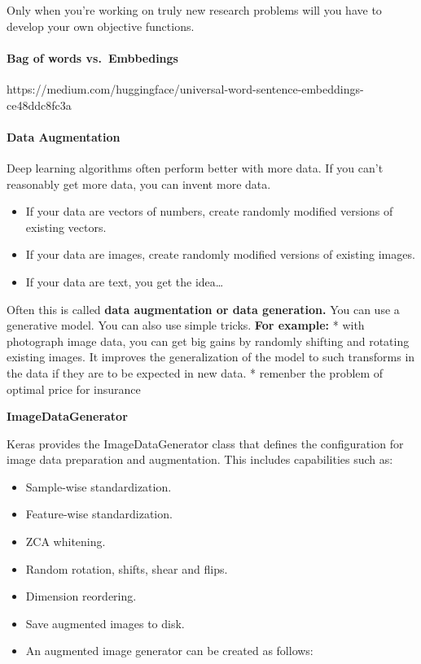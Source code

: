 \documentclass[11pt]{article}
\providecommand{\tightlist}{%
      \setlength{\itemsep}{0pt}\setlength{\parskip}{0pt}}
\begin{document}
Only when you're working on truly new research problems will you have to
develop your own objective functions.

\hypertarget{bag-of-words-vs.embbedings}{%
\paragraph{Bag of words
vs.~Embbedings}\label{bag-of-words-vs.embbedings}}

https://medium.com/huggingface/universal-word-sentence-embeddings-ce48ddc8fc3a

\hypertarget{data-augmentation}{%
\paragraph{Data Augmentation}\label{data-augmentation}}

Deep learning algorithms often perform better with more data. If you
can't reasonably get more data, you can invent more data.

\begin{itemize}
\tightlist
\item
  If your data are vectors of numbers, create randomly modified versions
  of existing vectors.
\item
  If your data are images, create randomly modified versions of existing
  images.
\item
  If your data are text, you get the idea\ldots{}
\end{itemize}

Often this is called \textbf{data augmentation or data generation.} You
can use a generative model. You can also use simple tricks. \textbf{For
example:} * with photograph image data, you can get big gains by
randomly shifting and rotating existing images. It improves the
generalization of the model to such transforms in the data if they are
to be expected in new data. * remenber the problem of optimal price for
insurance

\textbf{ImageDataGenerator }

Keras provides the ImageDataGenerator class that defines the
configuration for image data preparation and augmentation. This includes
capabilities such as:

\begin{itemize}
\tightlist
\item
  Sample-wise standardization.
\item
  Feature-wise standardization.
\item
  ZCA whitening.
\item
  Random rotation, shifts, shear and flips.
\item
  Dimension reordering.
\item
  Save augmented images to disk.
\item
  An augmented image generator can be created as follows:
\end{itemize}
\end{document}
